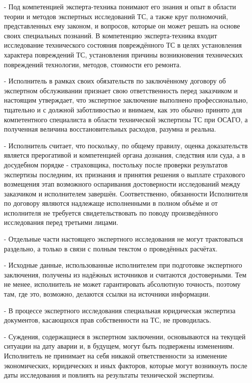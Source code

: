 \noindent - Под компетенцией эксперта-техника понимают его знания и опыт в области теории и методов экспертных исследований ТС, а также круг полномочий, представленных ему законом, и вопросов, которые он может решать на основе своих специальных познаний.
      В компетенцию эксперта-техника входит исследование технического состояния повреждённого ТС в целях установления характера повреждений ТС, установления причины возникновения технических повреждений технологии, методов, стоимости его ремонта.
      
\noindent - Исполнитель в рамках своих обязательств по заключённому договору об экспертном обслуживании признает свою ответственность перед заказчиком и настоящим утверждает, что экспертное заключение выполнено профессионально, тщательно и с должной заботливостью и внимаем, как это обычно принято для компетентного специалиста в области технической экспертизы ТС при ОСАГО, а полученная величина восстановительных расходов, разумна и реальна.

\noindent - Исполнитель считает, что поскольку, по общему правилу, оценка доказательств является прерогативой и компетенцией органа дознания, следствия или суда, а в досудебном порядке - страховщика, постольку после проверки результатов экспертизы последним, их признания и принятия решения о выплате страхового возмещения этап возможного оспаривания достоверности исследований между заказчиком и исполнителем завершён.
      Соответственно, обязанности Исполнителя по договору являются надлежаще исполненными в полном объёме и от исполнителя не требуется свидетельствовать по поводу произведённого исследования перед третьими лицами.
      
\noindent - Отдельные части настоящего экспертного исследования не могут трактоваться раздельно, а только в связи с полным текстом о проведённых расчётах.

\noindent - Исходные данные, использованные исполнителем при подготовке экспертного заключения, получены из надёжных источников и считаются достоверными. Тем не менее, исполнитель не может гарантировать абсолютную точность, поэтому там, где это, возможно, делаются ссылки на источники информации.

\noindent - В процессе экспертного исследования специальная юридическая экспертиза документов, касающихся прав собственности на ТС, не проводилась.

\noindent - Суждения, содержащиеся в экспертном заключении, основываются на текущей ситуации на дату аварии и, в будущем, могут быть подвержены изменениям.
Исполнитель не принимает на себя никакой ответственности за изменение экономических, юридических и иных факторов, которые могут возникнуть после даты исследования и повлиять на результаты технической экспертизы.

